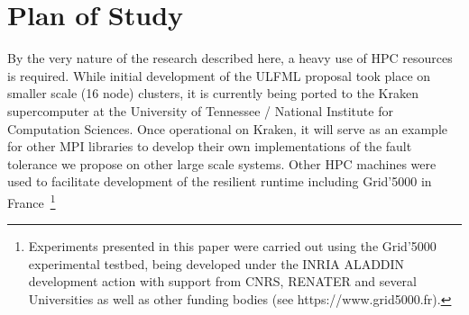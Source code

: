 \section{Plan of Study} \label{sect:planofstudy}

By the very nature of the research described here, a heavy use of HPC resources is required. While initial development of the ULFML proposal took place on smaller scale (16 node) clusters, it is currently being ported to the Kraken supercomputer at the University of Tennessee / National Institute for Computation Sciences. Once operational on Kraken, it will serve as an example for other MPI libraries to develop their own implementations of the fault tolerance we propose on other large scale systems. Other HPC machines were used to facilitate development of the resilient runtime including Grid'5000 in France~\footnote{Experiments presented in this paper were carried out using the Grid'5000 experimental testbed, being developed under the INRIA ALADDIN development action with support from CNRS, RENATER and several Universities as well as other funding bodies (see https://www.grid5000.fr).}